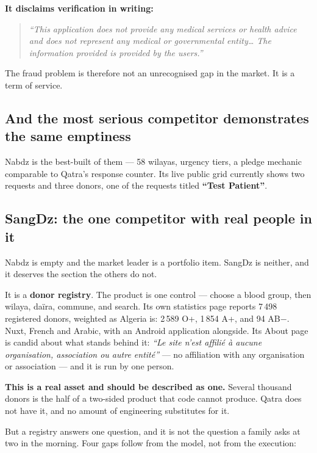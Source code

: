 \documentclass[11pt,a4paper]{article}
\begin{document}
\textbf{It disclaims verification in writing:}

\begin{quote}\itshape
``This application does not provide any medical services or health advice and
does not represent any medical or governmental entity\ldots{} The information
provided is provided by the users.''
\end{quote}

The fraud problem is therefore not an unrecognised gap in the market. It is a
term of service.

\subsection{And the most serious competitor demonstrates the same emptiness}

Nabdz is the best-built of them — 58 wilayas, urgency tiers, a pledge mechanic
comparable to Qatra's response counter. Its live public grid currently shows two
requests and three donors, one of the requests titled \textbf{``Test Patient''}.

\subsection{SangDz: the one competitor with real people in it}
\label{sec:sangdz}

Nabdz is empty and the market leader is a portfolio item. SangDz is neither, and
it deserves the section the others do not.

It is a \textbf{donor registry}. The product is one control — choose a blood
group, then wilaya, daïra, commune, and search. Its own statistics page reports
7\,498 registered donors, weighted as Algeria is: 2\,589 O+, 1\,854 A+, and 94
AB$-$. Nuxt, French and Arabic, with an Android application alongside. Its About
page is candid about what stands behind it: \emph{``Le site n'est affilié à
aucune organisation, association ou autre entité''} — no affiliation with any
organisation or association — and it is run by one person.

\textbf{This is a real asset and should be described as one.} Several thousand
donors is the half of a two-sided product that code cannot produce. Qatra does
not have it, and no amount of engineering substitutes for it.

But a registry answers one question, and it is not the question a family asks at
two in the morning. Four gaps follow from the model, not from the execution:
\end{document}
